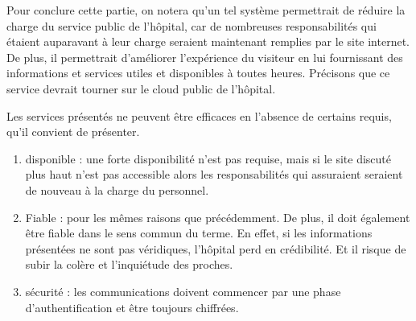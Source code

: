 Pour conclure cette partie, on notera qu'un tel système permettrait de réduire la charge du service public de l'hôpital, car de
nombreuses responsabilités qui étaient auparavant à leur charge seraient maintenant remplies par le site internet. De plus, il permettrait
d'améliorer l'expérience du visiteur en lui fournissant des informations et services utiles et disponibles à toutes heures.
Précisons que ce service devrait tourner sur le cloud public de l'hôpital.
\newline

Les services présentés ne peuvent être efficaces en l'absence de certains requis, qu'il convient de présenter.
\begin{enumerate}
    \item disponible : une forte disponibilité n'est pas requise, mais si le site discuté plus haut n'est pas accessible alors les
    responsabilités qui assuraient seraient de nouveau à la charge du personnel.
    \item Fiable : pour les mêmes raisons que précédemment. De plus, il doit également être fiable dans le sens commun du terme.
    En effet, si les informations présentées ne sont pas véridiques, l'hôpital perd en crédibilité. Et il risque de subir la
    colère et l'inquiétude des proches.
    \item sécurité : les communications doivent commencer par une phase d'authentification et être toujours chiffrées.
 \end{enumerate}
